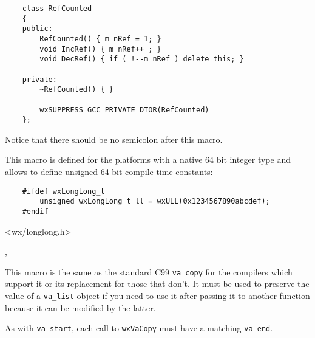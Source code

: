 \begin{verbatim}
    class RefCounted
    {
    public:
        RefCounted() { m_nRef = 1; }
        void IncRef() { m_nRef++ ; }
        void DecRef() { if ( !--m_nRef ) delete this; }

    private:
        ~RefCounted() { }

        wxSUPPRESS_GCC_PRIVATE_DTOR(RefCounted)
    };
\end{verbatim}

Notice that there should be no semicolon after this macro.


\label{wxull}


This macro is defined for the platforms with a native 64 bit integer type and
allows to define unsigned 64 bit compile time constants:

\begin{verbatim}
    #ifdef wxLongLong_t
        unsigned wxLongLong_t ll = wxULL(0x1234567890abcdef);
    #endif
\end{verbatim}


<wx/longlong.h>


, 


\label{wxvacopy}


This macro is the same as the standard C99 \texttt{va\_copy} for the compilers
which support it or its replacement for those that don't. It must be used to
preserve the value of a \texttt{va\_list} object if you need to use it after
passing it to another function because it can be modified by the latter.

As with \texttt{va\_start}, each call to \texttt{wxVaCopy} must have a matching
\texttt{va\_end}.


\label{wxwriteresource}



